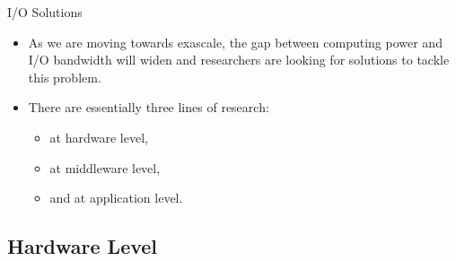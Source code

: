\documentclass[compress,11pt,xcolor=svgnames,aspectratio=169]{beamer}
\begin{document}
\begin{frame}[fragile]{I/O Solutions}

\begin{itemize}

\item As we are moving towards exascale, the gap between computing power and I/O bandwidth will
widen and researchers are looking for solutions to tackle this problem.\\[0.4cm]

\item There are essentially three lines of research:\\[0.4cm]

    \begin{itemize}
    \setlength\itemsep{0.6cm}

      \item at hardware level,
      \item at middleware level,
      \item and at application level.

    \end{itemize}

\end{itemize}

\nocite{3372390}

\end{frame}

\subsection{Hardware Level}
\end{document}
